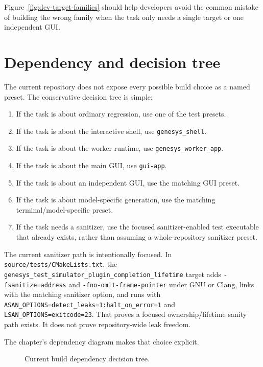 Figure~\ref{fig:dev-target-families} should help developers avoid the common
mistake of building the wrong family when the task only needs a single target
or one independent GUI.

\section{Dependency and decision tree}
\label{sec:dev-dependency-tree}

The current repository does not expose every possible build choice as a named
preset. The conservative decision tree is simple:
\begin{enumerate}
\item If the task is about ordinary regression, use one of the test presets.
\item If the task is about the interactive shell, use \texttt{genesys\_shell}.
\item If the task is about the worker runtime, use \texttt{genesys\_worker\_app}.
\item If the task is about the main GUI, use \texttt{gui-app}.
\item If the task is about an independent GUI, use the matching GUI preset.
\item If the task is about model-specific generation, use the matching
terminal/model-specific preset.
\item If the task needs a sanitizer, use the focused sanitizer-enabled test
executable that already exists, rather than assuming a whole-repository
sanitizer preset.
\end{enumerate}

The current sanitizer path is intentionally focused. In
\texttt{source/tests/CMakeLists.txt}, the
\texttt{genesys\_test\_simulator\_plugin\_completion\_lifetime} target adds
\texttt{-fsanitize=address} and \texttt{-fno-omit-frame-pointer} under GNU or
Clang, links with the matching sanitizer option, and runs with
\texttt{ASAN\_OPTIONS=detect\_leaks=1:halt\_on\_error=1} and
\texttt{LSAN\_OPTIONS=exitcode=23}. That proves a focused ownership/lifetime
sanity path exists. It does not prove repository-wide leak freedom.

The chapter's dependency diagram makes that choice explicit.

\begin{figure}[htbp]
\centering
\caption{Current build dependency decision tree.}
\label{fig:dev-dependency-tree}
\end{figure}


